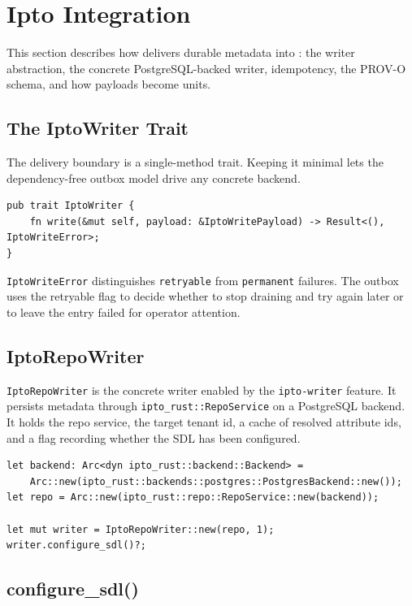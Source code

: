 \section{Ipto Integration}
\label{sec:ipto}

This section describes how \vannak{} delivers durable metadata into \ipto{}: the
writer abstraction, the concrete PostgreSQL-backed writer, idempotency, the
PROV-O schema, and how payloads become \ipto{} units.

\subsection{The IptoWriter Trait}

The delivery boundary is a single-method trait. Keeping it minimal lets the
dependency-free outbox model drive any concrete backend.

\begin{lstlisting}
pub trait IptoWriter {
    fn write(&mut self, payload: &IptoWritePayload) -> Result<(), IptoWriteError>;
}
\end{lstlisting}

\texttt{IptoWriteError} distinguishes \texttt{retryable} from \texttt{permanent}
failures. The outbox uses the retryable flag to decide whether to stop draining
and try again later or to leave the entry failed for operator attention.

\subsection{IptoRepoWriter}

\texttt{IptoRepoWriter} is the concrete writer enabled by the
\texttt{ipto-writer} feature. It persists metadata through
\texttt{ipto\_rust::RepoService} on a PostgreSQL backend. It holds the repo
service, the target tenant id, a cache of resolved attribute ids, and a flag
recording whether the SDL has been configured.

\begin{lstlisting}
let backend: Arc<dyn ipto_rust::backend::Backend> =
    Arc::new(ipto_rust::backends::postgres::PostgresBackend::new());
let repo = Arc::new(ipto_rust::repo::RepoService::new(backend));

let mut writer = IptoRepoWriter::new(repo, 1);
writer.configure_sdl()?;
\end{lstlisting}

\subsection{configure\_sdl()}

